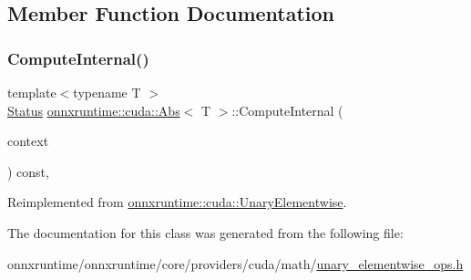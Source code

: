 \subsection{Member Function Documentation}
\mbox{\label{classonnxruntime_1_1cuda_1_1Abs_a1bf2979c1a4933cd6155c2952c1dc772}} 
\subsubsection{\texorpdfstring{Compute\+Internal()}{ComputeInternal()}}
{\footnotesize\ttfamily template$<$typename T $>$ \\
\mbox{\hyperlink{classonnxruntime_1_1common_1_1Status}{Status}} \mbox{\hyperlink{classonnxruntime_1_1cuda_1_1Abs}{onnxruntime\+::cuda\+::\+Abs}}$<$ T $>$\+::Compute\+Internal (\begin{DoxyParamCaption}\item[{\mbox{\hyperlink{classonnxruntime_1_1OpKernelContext}{Op\+Kernel\+Context}} $\ast$}]{context }\end{DoxyParamCaption}) const\hspace{0.3cm}{\ttfamily [override]}, {\ttfamily [virtual]}}



Reimplemented from \mbox{\hyperlink{classonnxruntime_1_1cuda_1_1UnaryElementwise_abbbcb29c3937e2ac9e2ad768d9c69fca}{onnxruntime\+::cuda\+::\+Unary\+Elementwise}}.



The documentation for this class was generated from the following file\+:\begin{DoxyCompactItemize}
\item 
onnxruntime/onnxruntime/core/providers/cuda/math/\mbox{\hyperlink{unary__elementwise__ops_8h}{unary\+\_\+elementwise\+\_\+ops.\+h}}\end{DoxyCompactItemize}
